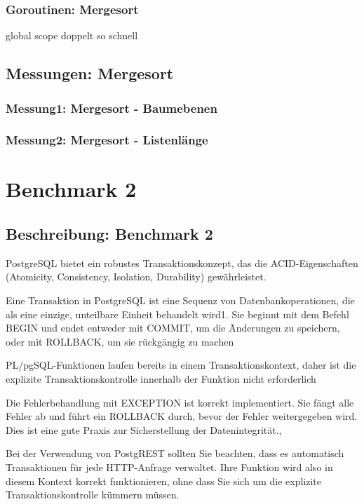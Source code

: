 \documentclass[fontsize=12pt,paper=a4,twoside=semi,parskip=half-,headsepline,headinclude]{scrreprt}
\begin{document}
\subsubsection{Goroutinen: Mergesort}

global scope doppelt so schnell

\subsection{Messungen: Mergesort}

\subsubsection{Messung1: Mergesort - Baumebenen}

\subsubsection{Messung2: Mergesort - Listenlänge}

\section{Benchmark 2}

\subsection{Beschreibung: Benchmark 2}

PostgreSQL bietet ein robustes Transaktionskonzept, das die ACID-Eigenschaften (Atomicity, Consistency, Isolation, Durability) gewährleistet.

Eine Transaktion in PostgreSQL ist eine Sequenz von Datenbankoperationen, die als eine einzige, unteilbare Einheit behandelt wird1. Sie beginnt mit dem Befehl BEGIN und endet entweder mit COMMIT, um die Änderungen zu speichern, oder mit ROLLBACK, um sie rückgängig zu machen

PL/pgSQL-Funktionen laufen bereits in einem Transaktionskontext, daher ist die explizite Transaktionskontrolle innerhalb der Funktion nicht erforderlich

Die Fehlerbehandlung mit EXCEPTION ist korrekt implementiert. Sie fängt alle Fehler ab und führt ein ROLLBACK durch, bevor der Fehler weitergegeben wird. Dies ist eine gute Praxis zur Sicherstellung der Datenintegrität.,

Bei der Verwendung von PostgREST sollten Sie beachten, dass es automatisch Transaktionen für jede HTTP-Anfrage verwaltet. Ihre Funktion wird also in diesem Kontext korrekt funktionieren, ohne dass Sie sich um die explizite Transaktionskontrolle kümmern müssen.
\end{document}
